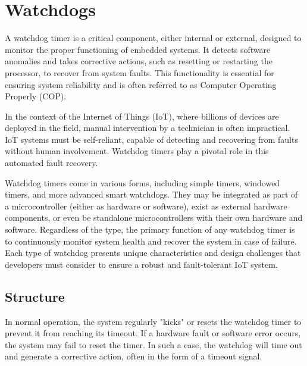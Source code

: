 \section{Watchdogs}

A watchdog timer is a critical component, either internal or external, designed to monitor the proper functioning of embedded systems.
It detects software anomalies and takes corrective actions, such as resetting or restarting the processor, to recover from system faults.
This functionality is essential for ensuring system reliability and is often referred to as Computer Operating Properly (COP).

In the context of the Internet of Things (IoT), where billions of devices are deployed in the field, manual intervention by a technician is often impractical. 
IoT systems must be self-reliant, capable of detecting and recovering from faults without human involvement. 
Watchdog timers play a pivotal role in this automated fault recovery.

Watchdog timers come in various forms, including simple timers, windowed timers, and more advanced smart watchdogs. 
They may be integrated as part of a microcontroller (either as hardware or software), exist as external hardware components, or even be standalone microcontrollers with their own hardware and software. 
Regardless of the type, the primary function of any watchdog timer is to continuously monitor system health and recover the system in case of failure. 
Each type of watchdog presents unique characteristics and design challenges that developers must consider to ensure a robust and fault-tolerant IoT system.

\subsection{Structure}
In normal operation, the system regularly "kicks" or resets the watchdog timer to prevent it from reaching its timeout. 
If a hardware fault or software error occurs, the system may fail to reset the timer. 
In such a case, the watchdog will time out and generate a corrective action, often in the form of a timeout signal.

